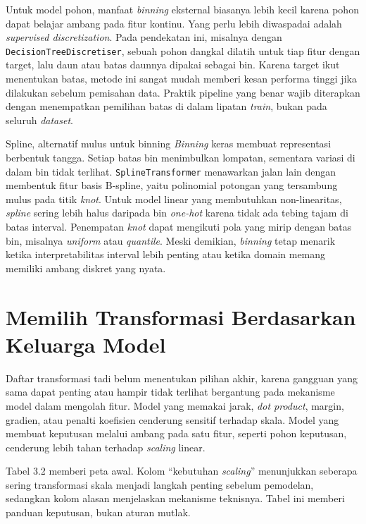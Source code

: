 Untuk model pohon, manfaat \emph{binning} eksternal biasanya lebih kecil karena pohon dapat belajar ambang pada fitur kontinu. Yang perlu lebih diwaspadai adalah \emph{supervised discretization}. Pada pendekatan ini, misalnya dengan \passthrough{\lstinline!DecisionTreeDiscretiser!}, sebuah pohon dangkal dilatih untuk tiap fitur dengan target, lalu daun atau batas daunnya dipakai sebagai bin. Karena target ikut menentukan batas, metode ini sangat mudah memberi kesan performa tinggi jika dilakukan sebelum pemisahan data. Praktik pipeline yang benar wajib diterapkan dengan menempatkan pemilihan batas di dalam lipatan \emph{train}, bukan pada seluruh \emph{dataset}.

\begin{pendalaman}{Spline, alternatif mulus untuk binning}
\emph{Binning} keras membuat representasi berbentuk tangga. Setiap batas bin menimbulkan lompatan, sementara variasi di dalam bin tidak terlihat. \passthrough{\lstinline!SplineTransformer!} menawarkan jalan lain dengan membentuk fitur basis B-spline, yaitu polinomial potongan yang tersambung mulus pada titik \emph{knot}. Untuk model linear yang membutuhkan non-linearitas, \emph{spline} sering lebih halus daripada bin \emph{one-hot} karena tidak ada tebing tajam di batas interval. Penempatan \emph{knot} dapat mengikuti pola yang mirip dengan batas bin, misalnya \emph{uniform} atau \emph{quantile}. Meski demikian, \emph{binning} tetap menarik ketika interpretabilitas interval lebih penting atau ketika domain memang memiliki ambang diskret yang nyata.
\end{pendalaman}

\section{Memilih Transformasi Berdasarkan Keluarga Model}\label{memilih-transformasi-berdasarkan-keluarga-model}

Daftar transformasi tadi belum menentukan pilihan akhir, karena gangguan yang sama dapat penting atau hampir tidak terlihat bergantung pada mekanisme model dalam mengolah fitur. Model yang memakai jarak, \emph{dot product}, margin, gradien, atau penalti koefisien cenderung sensitif terhadap skala. Model yang membuat keputusan melalui ambang pada satu fitur, seperti pohon keputusan, cenderung lebih tahan terhadap \emph{scaling} linear.

Tabel 3.2 memberi peta awal. Kolom ``kebutuhan \emph{scaling}'' menunjukkan seberapa sering transformasi skala menjadi langkah penting sebelum pemodelan, sedangkan kolom alasan menjelaskan mekanisme teknisnya. Tabel ini memberi panduan keputusan, bukan aturan mutlak.

